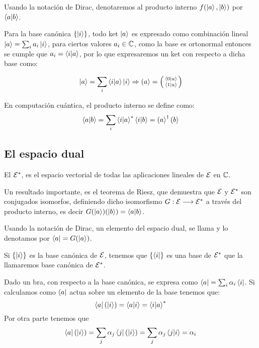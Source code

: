 Usando la notación de Dirac, denotaremos al producto interno $f(\ket{a}, \ket{b})$ por $\braket{a}{b}$.

Para la base canónica $\qty{\ket{i}}$, todo ket $\ket{a}$ es expresado como combinación lineal $\ket{a}=\sum_{i} a_i\ket{i}$, para ciertos valores $a_i\in\mathbb{C}$, como la base es ortonormal entonces se cumple que $a_i=\braket{i}{a}$, por lo que expresaremos un ket con respecto a dicha base como:

\begin{equation}
	\label{eq:ket-dirac}
	\ket{a}=\sum_i\braket{i}{a}\ket{i}\so\ketm{a}=\smqty(\braket{0}{a}\\\braket{1}{a})
\end{equation}

En computación cuántica, el producto interno se define como:
\begin{equation}
	\label{eq:producto-interno-definicion}
	\braket{a}{b}=\sum_i \braket{i}{a}^*\braket{i}{b}=\left(a\right>^\dagger\left(b\right>
\end{equation}

\subsection{El espacio dual}\label{subsec:el-espacio-dual}
El  $\mathcal{E}^*$, es el espacio vectorial de todas las aplicaciones lineales de $\mathcal{E}$ en $\mathbb{C}$.

Un resultado importante, es el teorema de Riesz, que demuestra que $\mathcal{E}$ y $\mathcal{E}^*$ son conjugados isomorfos, definiendo dicho isomorfismo $G:\mathcal{E}\longrightarrow \mathcal{E}^*$ a través del producto interno, es decir $G(\ket{a})(\ket{b})=\braket{a}{b}$.

Usando la notación de Dirac, un elemento del espacio dual, se llama  y lo denotamos por $\bra{a}=G(\ket{a})$.

Si $\qty{\ket{i}}$ es la base canónica de $\mathcal{E}$, tenemos que $\qty{\bra{i}}$ es una base de $\mathcal{E}^*$ que la llamaremos base canónica de $\mathcal{E}^*$.

Dado un bra, con respecto a la base canónica, se expresa como $\bra{a}=\sum_{i}\alpha_i\bra{i}$.
Si calculamos como $\bra{a}$ actua sobre un elemento de la base tenemos que:
\begin{equation*}
	\bra{a}(\ket{i})=\braket{a}{i}= \braket{i}{a}^*
\end{equation*}
Por otra parte tenemos que
\begin{equation*}
	\bra{a}(\ket{i})=\sum_{j}\alpha_j\bra{j}(\ket{i}) = \sum_{j}\alpha_j\braket{j}{i} = \alpha_i
\end{equation*}

